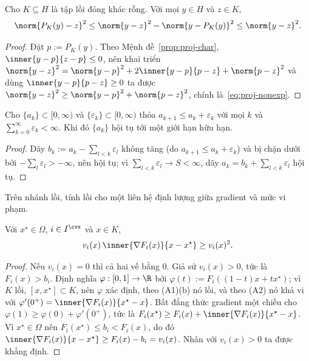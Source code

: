\begin{lemma}\label{lem:proj-nonexp}
Cho $K\subseteq H$ là tập lồi đóng khác rỗng. Với mọi $y\in H$ và $z\in K$,
\begin{equation}\label{eq:proj-nonexp}
\norm{P_K(y)-z}^2\le\norm{y-z}^2-\norm{y-P_K(y)}^2\le\norm{y-z}^2 .
\end{equation}
\end{lemma}
\begin{proof}
Đặt $p:=P_K(y)$. Theo Mệnh đề~\ref{prop:proj-char}, $\inner{y-p}{z-p}\le0$, nên khai triển
$\norm{y-z}^2=\norm{y-p}^2+2\inner{y-p}{p-z}+\norm{p-z}^2$ và dùng $\inner{y-p}{p-z}\ge0$
ta được $\norm{y-z}^2\ge\norm{y-p}^2+\norm{p-z}^2$, chính là~\eqref{eq:proj-nonexp}.
\end{proof}

\begin{lemma}\label{lem:seq}
Cho $\{a_k\}\subset[0,\infty)$ và $\{\varepsilon_k\}\subset[0,\infty)$ thỏa
$a_{k+1}\le a_k+\varepsilon_k$ với mọi $k$ và $\sum_{k=0}^\infty\varepsilon_k<\infty$.
Khi đó $\{a_k\}$ hội tụ tới một giới hạn hữu hạn.
\end{lemma}
\begin{proof}
Dãy $b_k:=a_k-\sum_{l<k}\varepsilon_l$ không tăng (do $a_{k+1}\le a_k+\varepsilon_k$) và
bị chặn dưới bởi $-\sum_l\varepsilon_l>-\infty$, nên hội tụ; vì
$\sum_{l<k}\varepsilon_l\to S<\infty$, dãy $a_k=b_k+\sum_{l<k}\varepsilon_l$ hội tụ.
\end{proof}

Trên nhánh lồi, tính lồi cho một liên hệ định lượng giữa gradient và
mức vi phạm.

\begin{lemma}\label{lem:grad-cvx}
Với $x^\star\in\Omega$, $i\in I^{\cvx}$ và $x\in K$,
\[
v_i(x)\,\inner{\nabla F_i(x)}{x-x^\star}\ge v_i(x)^2 .
\]
\end{lemma}
\begin{proof}
Nếu $v_i(x)=0$ thì cả hai vế bằng $0$. Giả sử $v_i(x)>0$, tức là $F_i(x)>b_i$. Định nghĩa
$\varphi:[0,1]\to\R$ bởi $\varphi(t):=F_i((1-t)x+tx^\star)$; vì $K$ lồi,
$[x,x^\star]\subset K$, nên $\varphi$ xác định, theo (A1)(b) nó lồi, và
theo (A2) nó khả vi với $\varphi'(0^+)=\inner{\nabla F_i(x)}{x^\star-x}$. Bất đẳng thức
gradient một chiều cho $\varphi(1)\ge\varphi(0)+\varphi'(0^+)$, tức là
$F_i(x^\star)\ge F_i(x)+\inner{\nabla F_i(x)}{x^\star-x}$. Vì $x^\star\in\Omega$ nên
$F_i(x^\star)\le b_i<F_i(x)$, do đó
$\inner{\nabla F_i(x)}{x-x^\star}\ge F_i(x)-b_i=v_i(x)$. Nhân với $v_i(x)>0$ ta được
khẳng định.
\end{proof}

